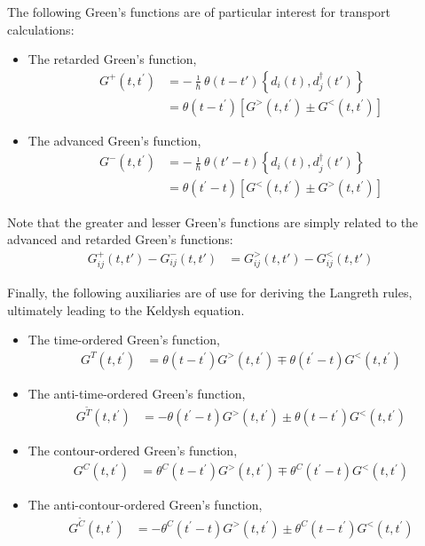 The following Green's functions are of particular interest for transport calculations: 
\begin{itemize}
\item The retarded Green's function, \begin{align*}
G^+(t,t^\prime) &=
-\frac{\imath}{\hbar} \theta(t-t') \left\{ d_i(t), d^\dagger_j(t')\right\}
\\ &=\theta(t-t^\prime) \left[ G^>(t,t^\prime) \pm G^<(t,t^\prime)\right]
\end{align*}
\item The advanced Green's function, \begin{align*}
G^-(t,t^\prime) &=
-\frac{\imath}{\hbar} \theta(t'-t) \left\{ d_i(t), d^\dagger_j(t')\right\}
\\ &= \theta(t^\prime-t) \left[ G^<(t,t^\prime) \pm G^>(t,t^\prime)\right]
\end{align*}
\end{itemize}
Note that the greater and lesser Green's functions are simply related to the advanced and retarded Green's functions:
\begin{align*}
G^+_{ij}(t,t') - G^-_{ij}(t,t') &= G^>_{ij}(t,t') - G^<_{ij}(t,t')
\end{align*}

Finally, the following auxiliaries are of use for deriving the Langreth rules, ultimately leading to the Keldysh equation.
\begin{itemize}
\item The time-ordered Green's function, \begin{align*}
G^T(t,t^\prime) &= \theta(t-t^\prime) G^>(t,t^\prime)  \mp \theta(t^\prime-t)G^<(t,t^\prime) 
\end{align*}
\item The anti-time-ordered Green's function, \begin{align*}
G^{\tilde{T}}(t,t^\prime) &= - \theta(t^\prime-t) G^>(t,t^\prime)  \pm \theta(t-t^\prime)G^<(t,t^\prime) 
\end{align*} 
\item The contour-ordered Green's function, \begin{align*}
G^C(t,t^\prime) &= \theta^C(t-t^\prime) G^>(t,t^\prime)  \mp \theta^C(t^\prime-t)G^<(t,t^\prime) 
\end{align*}
\item The anti-contour-ordered Green's function, \begin{align*}
G^{\tilde{C}}(t,t^\prime) &= - \theta^C(t^\prime-t) G^>(t,t^\prime)  \pm \theta^C(t-t^\prime)G^<(t,t^\prime)
\end{align*} 
\end{itemize}


